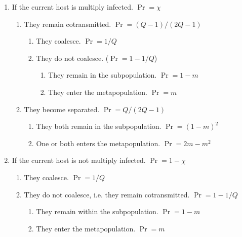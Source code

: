\documentclass[_main.tex]{subfiles}
\begin{document}
\begin{enumerate} [noitemsep]

\item If the current host is multiply infected. $\Pr = \chi$

\begin{enumerate} [noitemsep]

\item They remain cotransmitted.  $\Pr = (Q-1)/(2Q-1)$

\begin{enumerate} [noitemsep]

\item They coalesce. $\Pr = 1/Q$

\item They do not coalesce. ($\Pr = 1 - 1/Q$)

\begin{enumerate} [noitemsep]

\item They remain in the subpopulation. $\Pr = 1 - m$ 

\item They enter the metapopulation. $\Pr = m$

\end{enumerate}

\end{enumerate}

\item They become separated. $\Pr = Q/(2Q-1)$

\begin{enumerate} [noitemsep]

\item They both remain in the subpopulation. $\Pr = (1 - m)^2$ 

\item One or both enters the metapopulation. $\Pr = 2m - m^2$

\end{enumerate}

\end{enumerate}

\item If the current host is not multiply infected. $\Pr = 1 - \chi$

\begin{enumerate} [noitemsep]

\item They coalesce. $\Pr = 1/Q$

\item They do not coalesce, i.e. they remain cotransmitted.  $\Pr = 1 - 1/Q$

\begin{enumerate} [noitemsep]

\item They remain within the subpopulation. $\Pr = 1 - m$

\item They enter the metapopulation. $\Pr = m$

\end{enumerate}

\end{enumerate}

\end{enumerate}
\end{document}
